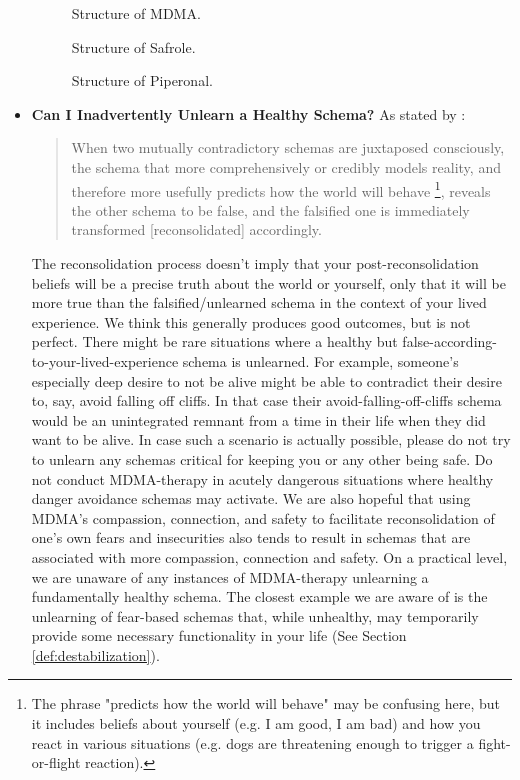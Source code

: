 \documentclass[12pt,letterpaper]{book}
\begin{document}
\begin{itemize}
        \FloatBarrier
        \begin{figure}
            \centering
            \caption{Structure of MDMA.}
            \label{fig:mdma}
        \end{figure}
        \begin{figure}
            \centering
            \caption{Structure of Safrole.}
            \label{fig:safrole}
        \end{figure}
        \begin{figure}
            \centering
            \caption{Structure of Piperonal.}
            \label{fig:piperonal}
        \end{figure}
        \FloatBarrier
    \item \textbf{Can I Inadvertently Unlearn a Healthy Schema?}
        As stated by \textcite{ecker2015misunderstood}:
        \begin{quotation}
         When two mutually contradictory schemas are juxtaposed consciously, the schema that more comprehensively or credibly models reality, and therefore more usefully predicts how the world will behave \footnote{The phrase "predicts how the world will behave" may be confusing here, but it includes beliefs about yourself (e.g. I am good, I am bad) and how you react in various situations (e.g. dogs are threatening enough to trigger a fight-or-flight reaction).}, reveals the other schema to be false, and the falsified one is immediately transformed [reconsolidated] accordingly.
        \end{quotation}
        The reconsolidation process doesn't imply that your post-reconsolidation beliefs will be a precise truth about the world or yourself, only that it will be more true than the falsified/unlearned schema in the context of your lived experience. We think this generally produces good outcomes, but is not perfect. There might be rare situations where a healthy but false-according-to-your-lived-experience schema is unlearned. For example, someone's especially deep desire to not be alive might be able to contradict their desire to, say, avoid falling off cliffs. In that case their avoid-falling-off-cliffs schema would be an unintegrated remnant from a time in their life when they did want to be alive. In case such a scenario is actually possible, please do not try to unlearn any schemas critical for keeping you or any other being safe. Do not conduct MDMA-therapy in acutely dangerous situations where healthy danger avoidance schemas may activate. We are also hopeful that using MDMA's compassion, connection, and safety to facilitate reconsolidation of one's own fears and insecurities also tends to result in schemas that are associated with more compassion, connection and safety. On a practical level, we are unaware of any instances of MDMA-therapy unlearning a fundamentally healthy schema. The closest example we are aware of is the unlearning of fear-based schemas that, while unhealthy, may temporarily provide some necessary functionality in your life (See Section \ref{def:destabilization}).
        

\end{itemize}
\end{document}
